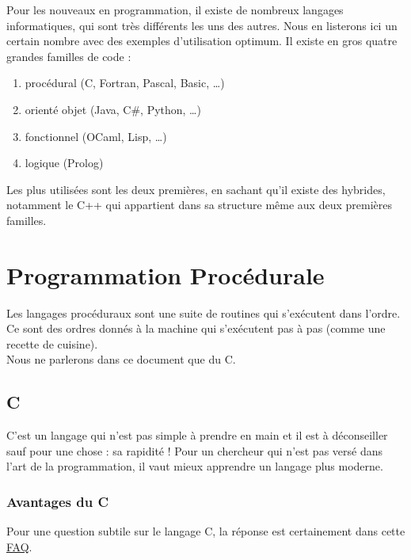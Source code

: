 
Pour les nouveaux en programmation, il existe de nombreux langages informatiques, qui sont très 
différents les uns des autres. Nous en listerons ici un certain nombre avec des exemples d'utilisation 
optimum. Il existe en gros quatre grandes familles de code :

\begin{enumerate}
\item procédural (C, Fortran, Pascal, Basic, \ldots)
\item orienté objet (Java, C\#, Python, \ldots)
\item fonctionnel (OCaml, Lisp, \ldots)
\item logique (Prolog)
\end{enumerate}

Les plus utilisées sont les deux premières, en sachant qu'il existe des hybrides, notamment le C++ 
qui appartient dans sa structure même aux deux premières familles. 

\section{Programmation Procédurale}

Les langages procéduraux sont une suite de routines qui s'exécutent dans l'ordre. Ce sont des ordres 
donnés à la machine qui s'exécutent pas à pas (comme une recette de cuisine).\\

Nous ne parlerons dans ce document que du C. 

\subsection{C}

C'est un langage qui n'est pas simple à prendre en main et il est \`a déconseiller sauf pour 
une chose : sa rapidité ! Pour un chercheur qui n'est pas versé dans l'art de la programmation,
il vaut mieux apprendre un langage plus moderne.

\subsubsection*{Avantages du C}
 Pour une question subtile sur le langage C, la réponse est certainement dans cette 
 \href{http://c-faq.com/}{FAQ}.
 
 
 
